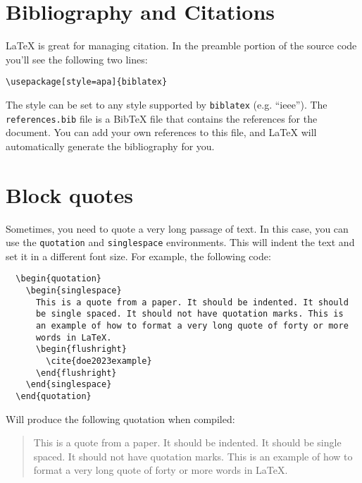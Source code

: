 \documentclass{thesis-dissertation}
\begin{document}
\section{Bibliography and Citations}
\LaTeX{} is great for managing citation. In the preamble portion of the source code you'll see the following two lines: \begin{center}
  \verb|\usepackage[style=apa]{biblatex}| \\
  \verb||
\end{center} 

The style can be set to any style supported by \texttt{biblatex} (e.g. ``ieee''). The \texttt{references.bib} file is a BibTeX file that contains the references for the document. You can add your own references to this file, and \LaTeX{} will automatically generate the bibliography for you.

\section{Block quotes}

Sometimes, you need to quote a very long passage of text. In this case, you can use the \texttt{quotation} and \texttt{singlespace} environments. This will indent the text and set it in a different font size. For example, the following code: \begin{singlespace}\begin{verbatim}
  \begin{quotation}
    \begin{singlespace}
      This is a quote from a paper. It should be indented. It should 
      be single spaced. It should not have quotation marks. This is 
      an example of how to format a very long quote of forty or more 
      words in LaTeX.
      \begin{flushright}
        \cite{doe2023example}
      \end{flushright}
    \end{singlespace}
  \end{quotation}
\end{verbatim}
\end{singlespace}
Will produce the following quotation when compiled:\begin{quotation}\begin{singlespace}This is a quote from a paper. It should be indented. It should be single spaced. It should not have quotation marks. This is an example of how to format a very long quote of forty or more words in LaTeX.\begin{flushright}\cite{doe2023example}\end{flushright}
\end{singlespace}\end{quotation}
\end{document}
